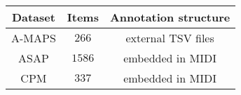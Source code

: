 \begin{tabular}{ccc}
    Dataset & Items  & Annotation structure     \\\hline
    A-MAPS  & $266$  & external TSV files       \\
    ASAP    & $1586$ & embedded in MIDI  \\
    CPM     & $337$  & embedded in MIDI
\end{tabular}
